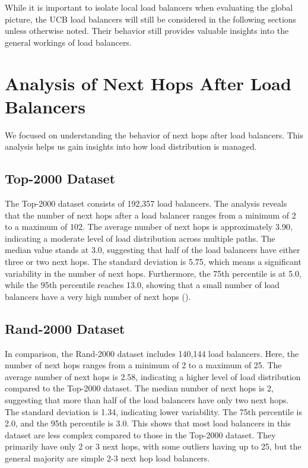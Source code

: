 \documentclass[12pt]{cwru_thesis}
\begin{document}
While it is important to isolate local load balancers when evaluating the global picture, the UCB load balancers will still be considered in the following sections unless otherwise noted. Their behavior still provides valuable insights into the general workings of load balancers.
\newpage

\section{Analysis of Next Hops After Load Balancers}

We focused on understanding the behavior of next hops after load balancers. This analysis helps us gain insights into how load distribution is managed.

\subsection{Top-2000 Dataset}

The Top-2000 dataset consists of 192,357 load balancers. The analysis reveals that the number of next hops after a load balancer ranges from a minimum of 2 to a maximum of 102. The average number of next hops is approximately 3.90, indicating a moderate level of load distribution across multiple paths. The median value stands at 3.0, suggesting that half of the load balancers have either three or two next hops. The standard deviation is 5.75, which means a significant variability in the number of next hops. Furthermore, the 75th percentile is at 5.0, while the 95th percentile reaches 13.0, showing that a small number of load balancers have a very high number of next hops ().

\subsection{Rand-2000 Dataset}

In comparison, the Rand-2000 dataset includes 140,144 load balancers. Here, the number of next hops ranges from a minimum of 2 to a maximum of 25. The average number of next hops is 2.58, indicating a higher level of load distribution compared to the Top-2000 dataset. The median number of next hops is 2, suggesting that more than half of the load balancers have only two next hops. The standard deviation is 1.34, indicating lower variability. The 75th percentile is 2.0, and the 95th percentile is 3.0. This shows that most load balancers in this dataset are less complex compared to those in the Top-2000 dataset. They primarily have only 2 or 3 next hops, with some outliers having up to 25, but the general majority are simple 2-3 next hop load balancers.
\end{document}
